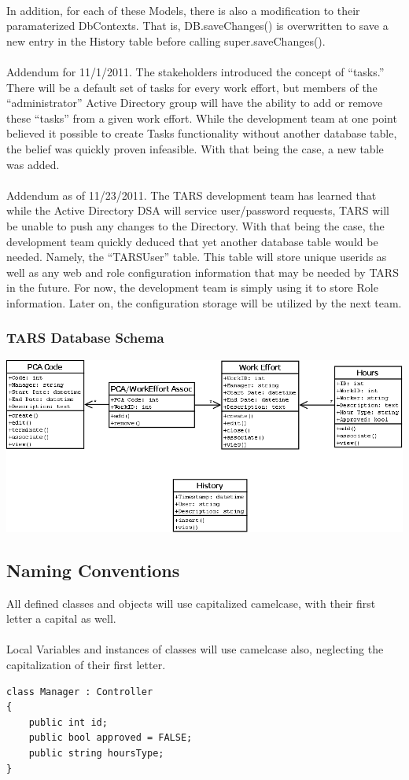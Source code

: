 \documentclass[letterpaper]{article}
\begin{document}
\\
In addition, for each of these Models, there is also a modification to their paramaterized DbContexts. That is, DB.saveChanges() is overwritten to save a new entry in the History table before calling super.saveChanges(). \\
\\
Addendum for 11/1/2011. The stakeholders introduced the concept of ``tasks.'' There will be a default set of tasks for every work effort, but members of the ``administrator'' Active Directory group will have the ability to add or remove these ``tasks'' from a given work effort. While the development team at one point believed it possible to create Tasks functionality without another database table, the belief was quickly proven infeasible. With that being the case, a new table was added.\\
\\
Addendum as of 11/23/2011. The TARS development team has learned that while the Active Directory DSA will service user/password requests, TARS will be unable to push any changes to the Directory. With that being the case, the development team quickly deduced that yet another database table would be needed. Namely, the ``TARSUser'' table. This table will store unique userids as well as any web and role configuration information that may be needed by TARS in the future. For now, the development team is simply using it to store Role information. Later on, the configuration storage will be utilized by the next team.

\subsubsection{TARS Database Schema}
\includegraphics[scale=0.4]{../design/images/class_diagram_1.png}
\subsection{Naming Conventions}
All defined classes and objects will use capitalized camelcase, with their first letter a capital as well.\\
\\
Local Variables and instances of classes will use camelcase also, neglecting the capitalization of their first letter.
\begin{verbatim}
class Manager : Controller
{
    public int id;
    public bool approved = FALSE;
    public string hoursType;
}
\end{verbatim}
\end{document}
